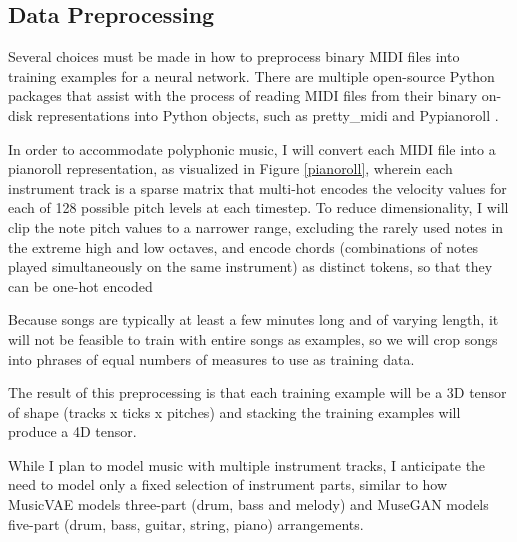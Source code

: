 \documentclass[sigconf,authorversion]{acmart}
\begin{document}
\subsection{Data Preprocessing}

Several choices must be made in how to preprocess binary MIDI files
into training examples for a neural network. There are multiple
open-source Python packages that assist with the process of reading
MIDI files from their binary on-disk representations into Python
objects, such as pretty\_midi \cite{raffel_pretty_midi_2014} and
Pypianoroll \cite{dong_pypianoroll_2018}.

In order to accommodate polyphonic music, I will convert each MIDI
file into a pianoroll representation, as visualized in Figure
\ref{pianoroll}, wherein each instrument track is a sparse matrix that
multi-hot encodes the velocity values for each of 128 possible pitch
levels at each timestep. To reduce dimensionality, I will clip the
note pitch values to a narrower range, excluding the rarely used notes
in the extreme high and low octaves, and encode chords (combinations
of notes played simultaneously on the same instrument) as distinct
tokens, so that they can be one-hot encoded

Because songs are typically at least a few minutes long and of varying
length, it will not be feasible to train with entire songs as
examples, so we will crop songs into phrases of equal numbers of
measures to use as training data.

The result of this preprocessing is that each training example will be
a 3D tensor of shape (tracks x ticks x pitches) and stacking the
training examples will produce a 4D tensor.

While I plan to model music with multiple instrument tracks, I
anticipate the need to model only a fixed selection of instrument
parts, similar to how MusicVAE models three-part (drum, bass and
melody) \cite{roberts_hierarchical_2018} and MuseGAN models five-part
(drum, bass, guitar, string, piano) arrangements.
\end{document}
